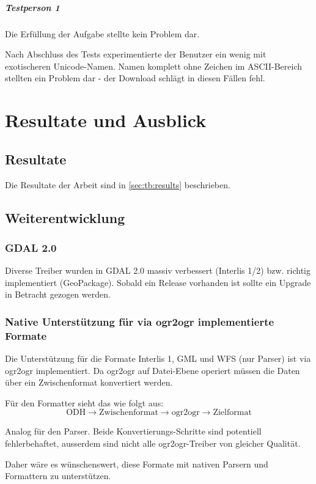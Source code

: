 \paragraph{Testperson 1}
Die Erfüllung der Aufgabe stellte kein Problem dar.

Nach Abschluss des Tests experimentierte der Benutzer ein wenig mit exotischeren Unicode-Namen. Namen komplett ohne Zeichen im ASCII-Bereich stellten ein Problem dar - der Download schlägt in diesen Fällen fehl. 
\chapter{Resultate und Ausblick}

\section{Resultate}
Die Resultate der Arbeit sind in \vref{sec:tb:results} beschrieben.

\section{Weiterentwicklung}

\subsection{GDAL 2.0}
Diverse Treiber wurden in GDAL 2.0 massiv verbessert (Interlis 1/2) bzw. richtig implementiert (GeoPackage). Sobald ein Release vorhanden ist sollte ein Upgrade in Betracht gezogen werden.

\subsection{Native Unterstützung für via ogr2ogr implementierte Formate}
Die Unterstützung für die Formate Interlis 1, GML und WFS (nur Parser) ist via ogr2ogr implementiert. Da ogr2ogr auf Datei-Ebene operiert müssen die Daten über ein Zwischenformat konvertiert werden.

Für den Formatter sieht das wie folgt aus:
$$ \text{ODH} \to \text{Zwischenformat} \to \text{ogr2ogr} \to \text{Zielformat} $$

Analog für den Parser. Beide Konvertierungs-Schritte sind potentiell fehlerbehaftet, ausserdem sind nicht alle ogr2ogr-Treiber von gleicher Qualität.

Daher wäre es wünschenswert, diese Formate mit nativen Parsern und Formattern zu unterstützen. 

